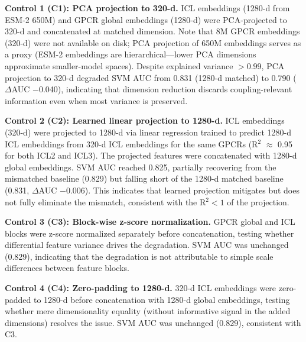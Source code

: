 \documentclass[11pt,a4paper]{article}
\begin{document}
\textbf{Control 1 (C1): PCA projection to 320-d.} ICL embeddings (1280-d from ESM-2 650M) and GPCR global embeddings (1280-d) were PCA-projected to 320-d and concatenated at matched dimension. Note that 8M GPCR embeddings (320-d) were not available on disk; PCA projection of 650M embeddings serves as a proxy (ESM-2 embeddings are hierarchical---lower PCA dimensions approximate smaller-model spaces). Despite explained variance $>$0.99, PCA projection to 320-d degraded SVM AUC from 0.831 (1280-d matched) to 0.790 ($\Delta$AUC $-$0.040), indicating that dimension reduction discards coupling-relevant information even when most variance is preserved.

\textbf{Control 2 (C2): Learned linear projection to 1280-d.} ICL embeddings (320-d) were projected to 1280-d via linear regression trained to predict 1280-d ICL embeddings from 320-d ICL embeddings for the same GPCRs (R$^2$ $\approx$ 0.95 for both ICL2 and ICL3). The projected features were concatenated with 1280-d global embeddings. SVM AUC reached 0.825, partially recovering from the mismatched baseline (0.829) but falling short of the 1280-d matched baseline (0.831, $\Delta$AUC $-$0.006). This indicates that learned projection mitigates but does not fully eliminate the mismatch, consistent with the R$^2 < 1$ of the projection.

\textbf{Control 3 (C3): Block-wise z-score normalization.} GPCR global and ICL blocks were z-score normalized separately before concatenation, testing whether differential feature variance drives the degradation. SVM AUC was unchanged (0.829), indicating that the degradation is not attributable to simple scale differences between feature blocks.

\textbf{Control 4 (C4): Zero-padding to 1280-d.} 320-d ICL embeddings were zero-padded to 1280-d before concatenation with 1280-d global embeddings, testing whether mere dimensionality equality (without informative signal in the added dimensions) resolves the issue. SVM AUC was unchanged (0.829), consistent with C3.
\end{document}
